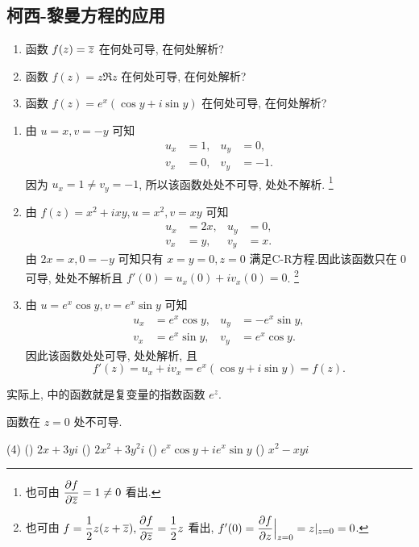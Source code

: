 \subsection{柯西-黎曼方程的应用}

\begin{example}
  \begin{enumerate}
    \item 函数 $f(z)=\overline z$ 在何处可导, 在何处解析?
    \item 函数 $f(z)=z\Re z$ 在何处可导, 在何处解析?
    \item 函数 $f(z)=e^x(\cos y+i\sin y)$ 在何处可导, 在何处解析?
  \end{enumerate}
\end{example}
\begin{solution}
  \begin{enumerate}
    \item 由 $u=x,v=-y$ 可知
      \begin{align*}
        u_x&=1,&u_y&=0,\\
        v_x&=0,&v_y&=-1.
      \end{align*}
    因为 $u_x=1\neq v_y=-1$, 所以该函数处处不可导, 处处不解析.
    \footnote{也可由 $\dfrac{\partial f}{\partial \overline z}=1\neq0$ 看出.}
    \item 由 $f(z)=x^2+ixy,u=x^2,v=xy$ 可知
      \begin{align*}
        u_x&=2x,&u_y&=0,\\
        v_x&=y, &v_y&=x.
      \end{align*}
    由 $2x=x,0=-y$ 可知只有 $x=y=0,z=0$ 满足C-R方程.因此该函数只在 $0$ 可导, 处处不解析且 $f'(0)=u_x(0)+iv_x(0)=0$.
    \footnote{也可由 $f=\dfrac12 z(z+\overline z), \dfrac{\partial f}{\partial \overline z}=\dfrac12 z$ 看出, $f'(0)=\dfrac{\partial f}{\partial z}\Big|_{z=0}=z|_{z=0}=0$.}
    \item 由 $u=e^x\cos y,v=e^x\sin y$ 可知
      \begin{align*}
        u_x&=e^x\cos y,&u_y&=-e^x\sin y,\\
        v_x&=e^x\sin y,&v_y&=e^x\cos y.
      \end{align*}
    因此该函数处处可导, 处处解析, 且
      \[f'(z)=u_x+iv_x=e^x(\cos y+i\sin y)=f(z).\]
  \end{enumerate}
\end{solution}

实际上,  中的函数就是复变量的指数函数 $e^z$.

\begin{exercise}
	函数\fillbrace{}在 $z=0$ 处不可导.
	\begin{taskschoice}(4)
		() $2x+3yi$
		() $2x^2+3y^2i$
		() $e^x\cos y+i e^x\sin y$
		() $x^2-xyi$
	\end{taskschoice}
\end{exercise}

